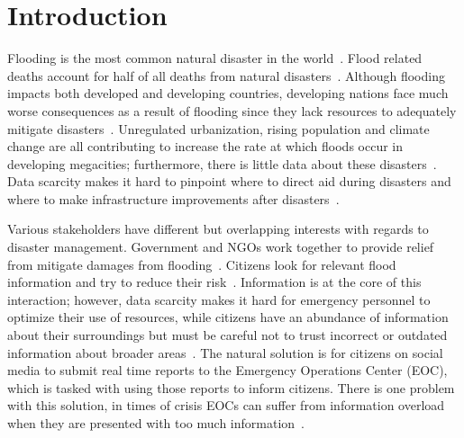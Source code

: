 \chapter{Introduction} Flooding is the most common natural disaster in the
world~\cite{chanFloodRiskAsia2012}.  Flood related deaths account for half of
all deaths from natural disasters~\cite{ohlFloodingHumanHealth2000}.  Although
flooding impacts both developed and developing countries, developing nations
face much worse consequences as a result of flooding since they lack resources
to adequately mitigate
disasters~\cite{quarantelliUrbanVulnerabilityDisasters2003}.  Unregulated
urbanization, rising population and climate change are all contributing to
increase the rate at which floods occur in developing megacities; furthermore,
there is little data about these
disasters~\cite{meierDigitalHumanitariansHow2015}.
Data scarcity makes it hard to pinpoint where to direct aid during disasters and
where to make infrastructure improvements after
disasters~\cite{ranaMultidimensionalModelVulnerability2018}.

Various stakeholders have different but overlapping interests with regards to
disaster management.  Government and NGOs work together to provide relief from
mitigate damages from flooding~\cite{chanResilientFloodRisk2018}. Citizens look
for relevant flood information and try to reduce their
risk~\cite{viewegMicrobloggingTwoNatural2010}.  Information is at the core of
this interaction; however, data scarcity makes it hard for emergency personnel
to optimize their use of resources, while citizens have an abundance of
information about their surroundings but must be careful not to trust incorrect
or outdated information about broader
areas~\cite{quarantelliProblematicalAspectsInformation1997}. The natural
solution is for citizens on social media to submit real time reports to the
Emergency Operations Center (EOC), which is tasked with using those reports to
inform citizens.  There is one problem with this solution, in times of crisis
EOCs can suffer from information overload when they are presented with too much
information~\cite{tierneyFacingUnexpectedDisaster2001}.

